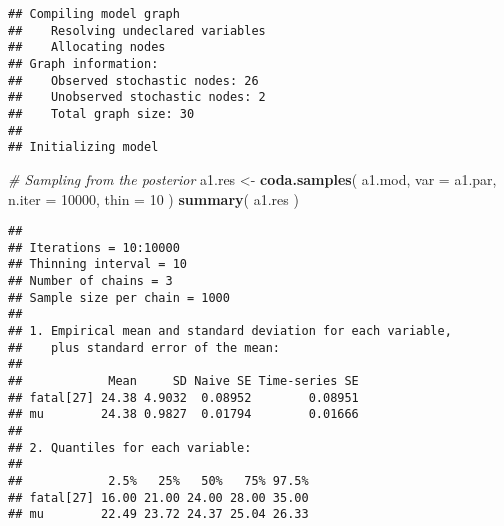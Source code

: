 \documentclass[]{article}
\newenvironment{Shaded}{\begin{snugshade}}{\end{snugshade}}
\newcommand{\KeywordTok}[1]{\textcolor[rgb]{0.13,0.29,0.53}{\textbf{#1}}}
\newcommand{\DataTypeTok}[1]{\textcolor[rgb]{0.13,0.29,0.53}{#1}}
\newcommand{\DecValTok}[1]{\textcolor[rgb]{0.00,0.00,0.81}{#1}}
\newcommand{\StringTok}[1]{\textcolor[rgb]{0.31,0.60,0.02}{#1}}
\newcommand{\CommentTok}[1]{\textcolor[rgb]{0.56,0.35,0.01}{\textit{#1}}}
\newcommand{\NormalTok}[1]{#1}
\begin{document}
\begin{verbatim}
## Compiling model graph
##    Resolving undeclared variables
##    Allocating nodes
## Graph information:
##    Observed stochastic nodes: 26
##    Unobserved stochastic nodes: 2
##    Total graph size: 30
## 
## Initializing model
\end{verbatim}

\begin{Shaded}
\begin{Highlighting}[]
\CommentTok{# Sampling from the posterior}
\NormalTok{a1.res <-}\StringTok{ }\KeywordTok{coda.samples}\NormalTok{( a1.mod,}
                      \DataTypeTok{var =}\NormalTok{ a1.par,}
                      \DataTypeTok{n.iter =} \DecValTok{10000}\NormalTok{,}
                      \DataTypeTok{thin =} \DecValTok{10}\NormalTok{ )}
\KeywordTok{summary}\NormalTok{( a1.res )}
\end{Highlighting}
\end{Shaded}

\begin{verbatim}
## 
## Iterations = 10:10000
## Thinning interval = 10 
## Number of chains = 3 
## Sample size per chain = 1000 
## 
## 1. Empirical mean and standard deviation for each variable,
##    plus standard error of the mean:
## 
##            Mean     SD Naive SE Time-series SE
## fatal[27] 24.38 4.9032  0.08952        0.08951
## mu        24.38 0.9827  0.01794        0.01666
## 
## 2. Quantiles for each variable:
## 
##            2.5%   25%   50%   75% 97.5%
## fatal[27] 16.00 21.00 24.00 28.00 35.00
## mu        22.49 23.72 24.37 25.04 26.33
\end{verbatim}
\end{document}
